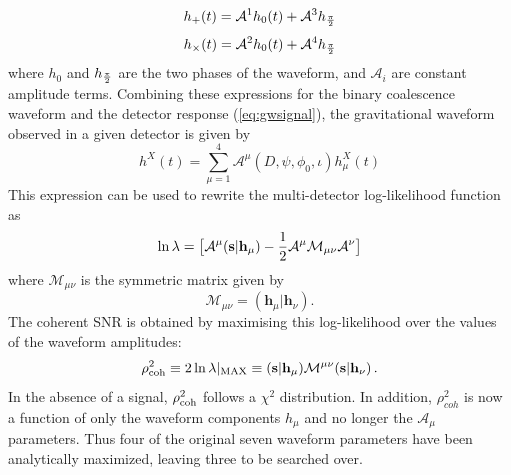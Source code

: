 \documentclass[binding=0.6cm, LaM]{sapthesis}
\begin{document}
		\begin{equation}
			h_+(t) = \mathcal{A}^1h_0(t) + \mathcal{A}^3h_{{{\pi} \over {2}}}
		\end{equation}		
		\begin{equation}
			h_{\times}(t) = \mathcal{A}^2h_0(t) + \mathcal{A}^4h_{{{\pi} \over {2}}}
		\end{equation}
 	where $h_0$ and $h_{{{\pi} \over {2}}}$ are the two phases of the waveform,
	and $\mathcal{A}_i$ are constant amplitude terms.
	Combining these expressions for the binary coalescence waveform 
	and the detector response (\ref{eq:gwsignal}),
	the gravitational waveform observed in a given detector is given by
		\begin{equation}
			h^X(t) = \sum_{\mu=1}^4\mathcal{A}^{\mu}(D,\psi,\phi_0,\iota)h_{\mu}^X(t)
		\end{equation}
	This expression can be used to rewrite the multi-detector log-likelihood function as 
		\begin{equation}
			\ln\lambda = \big[  \mathcal{A}^{\mu}(\textbf{s}|\textbf{h}_{\mu}) - {{1}\over{2}}\mathcal{A}^{\mu}\mathcal{M}_{\mu\nu}\mathcal{A}^{\nu} \big]
		\end{equation}
	where $\mathcal{M}_{\mu\nu}$ is the symmetric matrix given by
		\begin{equation}
			\mathcal{M}_{\mu\nu}  = (\textbf{h}_{\mu}|\textbf{h}_{\nu}).
		\end{equation}
	The coherent SNR is obtained by maximising this log-likelihood 
	over the values of the waveform amplitudes:
		\begin{equation}
			\rho^2_{\rm coh}\equiv 2 \ln \lambda |_{\rm MAX}\equiv (\textbf{s}|\textbf{h}_{\mu})\mathcal{M}^{\mu\nu}(\textbf{s}|\textbf{h}_{\nu})\,.
		\end{equation}
	In the absence of a signal, $\rho^2_{\rm coh}$ follows a $\chi^2$ distribution.
	In addition, $\rho^2_{coh}$ is now a function of only the waveform components $h_{\mu}$ 
	and no longer the $\mathcal{A}_{\mu}$ parameters. 
	Thus four of the original seven waveform parameters have been analytically maximized, leaving three to be searched over.
\end{document}
